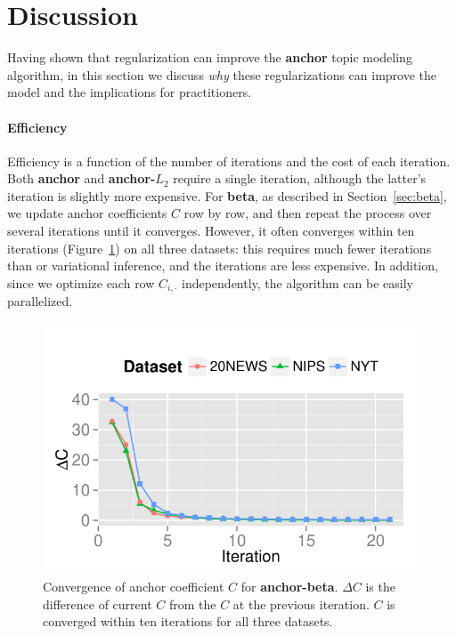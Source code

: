 \section{Discussion}
\label{sec:disc}

Having shown that regularization can improve the {\bf anchor} topic
modeling algorithm, in this section we discuss \emph{why} these regularizations can
improve the model and the implications for practitioners.

\paragraph{Efficiency}

Efficiency is a function of the number of iterations and the cost of
each iteration.  Both {\bf anchor} and {\bf anchor-$L_2$} require a
single iteration, although the latter's iteration is slightly more
expensive.  For {\bf beta}, as described in Section~\ref{sec:beta}, we
update anchor coefficients $C$ row by row, and then repeat the process
over several iterations until it converges.  However, it often
converges within ten iterations (Figure~\ref{fig:convergence}) on all
three datasets: this requires much fewer iterations than  or variational
inference, and the iterations are less expensive.  In addition, since
we optimize each row $C_{i,\cdot}$ independently, the algorithm can be
easily parallelized.

\begin{figure}[t!]
\centering
\includegraphics[width=\linewidth]{2014_acl_reganchor/figures/Convergence_C.pdf}
\caption{Convergence of anchor coefficient $C$ for {\bf anchor-beta}.
$\Delta C$ is the difference of current $C$ from the $C$ at the previous iteration.
$C$ is converged within ten iterations for all three datasets.}
\label{fig:convergence}
\end{figure}

